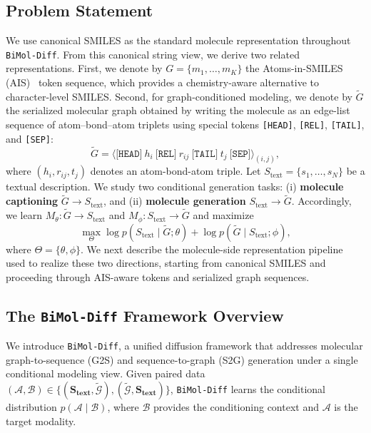 \subsection{Problem Statement}\label{sec:problem}
We use canonical SMILES as the standard molecule representation throughout
\texttt{BiMol-Diff}. From this canonical string view, we derive two related
representations. First, we denote by
$G = \{m_1,\ldots,m_K\}$ the Atoms-in-SMILES (AIS)~\citep{article} token sequence,
which provides a chemistry-aware alternative to character-level SMILES.
Second, for graph-conditioned modeling, we denote by $\tilde{G}$ the
serialized molecular graph obtained by writing the molecule as an
edge-list sequence of atom--bond--atom triplets using special tokens
\texttt{[HEAD]}, \texttt{[REL]}, \texttt{[TAIL]}, and \texttt{[SEP]}:
\[
\tilde{G}
=
\big\langle
\texttt{[HEAD]}~h_i~
\texttt{[REL]}~r_{ij}~
\texttt{[TAIL]}~t_j~
\texttt{[SEP]}
\big\rangle_{(i,j)},
\]
where $(h_i,r_{ij},t_j)$ denotes an atom-bond-atom triple.
Let $S_{\text{text}} = \{s_1,\ldots,s_N\}$ be a textual description.
We study two conditional generation tasks:
(i) \textbf{molecule captioning} $\tilde{G} \rightarrow S_{\text{text}}$, and
(ii) \textbf{molecule generation} $S_{\text{text}} \rightarrow \tilde{G}$.
Accordingly, we learn
$M_\theta : \tilde{G} \rightarrow S_{\text{text}}$ and
$M_\phi : S_{\text{text}} \rightarrow \tilde{G}$ and maximize
\[
\max_{\Theta}
\log p(S_{\text{text}} \mid \tilde{G}; \theta)
+
\log p(\tilde{G} \mid S_{\text{text}}; \phi),
\]
where $\Theta=\{\theta,\phi\}$.
We next describe the molecule-side representation pipeline used to realize these two directions, starting from canonical SMILES and proceeding through AIS-aware tokens and serialized graph sequences.




\subsection{The \texttt{BiMol-Diff} Framework Overview}

We introduce \texttt{BiMol-Diff}, a unified diffusion framework that addresses
molecular graph-to-sequence (G2S) and sequence-to-graph (S2G)
generation under a single conditional modeling view. Given paired data \((\mathcal{A}, \mathcal{B}) \in \{(\mathbf{S_{text}}, \tilde{\mathcal{G}}), (\tilde{\mathcal{G}}, \mathbf{S_{text}})\}\), \texttt{BiMol-Diff} learns the conditional distribution \(p(\mathcal{A}\mid \mathcal{B})\), where \(\mathcal{B}\) provides the conditioning context and \(\mathcal{A}\) is the target modality.

